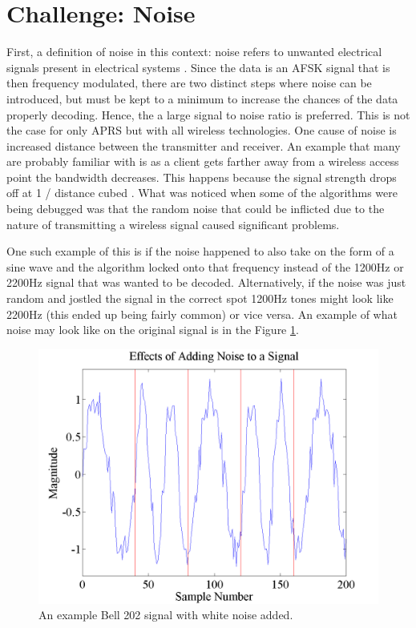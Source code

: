 \section{Challenge: Noise}
First, a definition of noise in this context: noise refers to unwanted electrical signals present in electrical systems \cite{Sklar1988}. Since the data is an AFSK signal that is then frequency modulated, there are two distinct steps where noise can be introduced, but must be kept to a minimum to increase the chances of the data properly decoding. Hence, the a large signal to noise ratio is preferred. This is not the case for only APRS but with all wireless technologies. One cause of noise is increased distance between the transmitter and receiver. An example that many are probably familiar with is as a client gets farther away from a wireless access point the bandwidth decreases. This happens because the signal strength drops off at 1 / distance cubed \cite{4Gon}. What was noticed when some of the algorithms were being debugged was that the random noise that could be inflicted due to the nature of transmitting a wireless signal caused significant problems.

One such example of this is if the noise happened to also take on the form of a sine wave and the algorithm locked onto that frequency instead of the 1200Hz or 2200Hz signal that was wanted to be decoded. Alternatively, if the noise was just random and jostled the signal in the correct spot 1200Hz tones might look like 2200Hz (this ended up being fairly common) or vice versa. An example of what noise may look like on the original signal is in the Figure \ref{noiseExample}.
\begin{figure}
  \centering
	\includegraphics[width=0.75\linewidth]{images/EffectsofAddingNoisetoaSignal.png} 
	\caption{An example Bell 202 signal with white noise added.}
   \label{noiseExample}
\end{figure}

